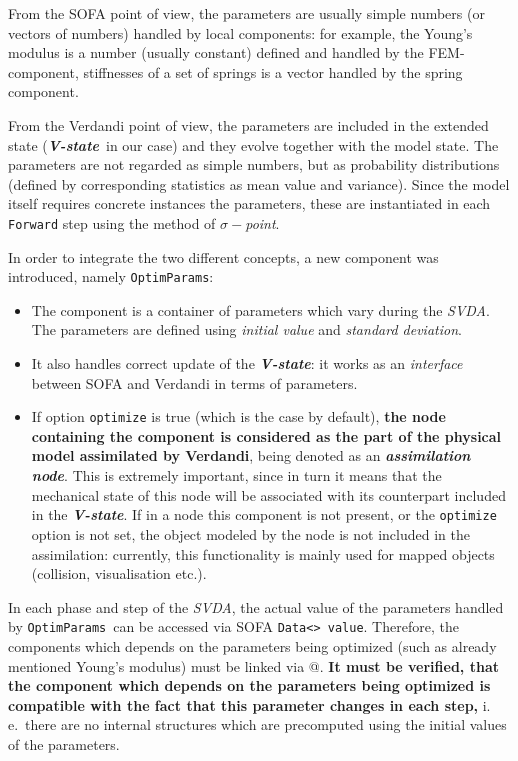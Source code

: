 \documentclass[10pt]{article}
\def\ie{i.\,e.}
\def\asn{\textit{\textbf{assimilation node}}}
\def\vstate{\textit{\textbf{V-state}}}
\def\svda{\textit{SVDA}}
\def\smp{$\sigma-$\textit{point}}
\def\opr{\texttt{OptimParams}}
\begin{document}
From the SOFA point of view, the parameters are usually simple numbers (or vectors of numbers) handled by local components: for example, the Young's modulus is a number (usually constant) defined and handled by the FEM-component, stiffnesses of a set of springs is a vector handled by the spring component. 

From the Verdandi point of view, the parameters are included in the extended  state (\vstate\ in our case) and they evolve together with the model state. The parameters are not regarded as simple numbers, 
but as probability distributions (defined by corresponding statistics as mean value and variance). Since the model itself requires concrete instances the parameters, these are instantiated in each \texttt{Forward} step using the method of \smp.

In order to integrate the two different concepts, a new component was introduced, namely \opr:
\begin{itemize}
\item The component is a container of parameters which vary during the \svda. The parameters are defined using \emph{initial value} and \emph{standard deviation}.
\item It also handles correct update of the \vstate: it works as an \emph{interface} between SOFA and Verdandi in terms of parameters. 
\item If option \texttt{optimize} is true (which is the case by default), \textbf{the node containing the component is considered as the part of the physical model assimilated by Verdandi}, being denoted as an \asn. This is extremely important, since in turn it means that the mechanical state of this node will be associated with its counterpart included in the \vstate. If in a node this component is not present, or the \texttt{optimize} option is not set, the object modeled by the node is not included in the assimilation: currently, this functionality is mainly used for mapped objects (collision, visualisation etc.). 
\end{itemize}
In each phase and step of the \svda, the actual value of the parameters handled by \opr\ can be accessed via SOFA \texttt{Data<> value}. Therefore, the components which depends on the parameters being optimized (such as already mentioned Young's modulus) must be linked via @. \textbf{It must be verified, that the component which depends on the parameters being optimized is compatible with the fact that this parameter changes in each step,} \ie\ there are no internal structures which are precomputed using the initial values of the parameters. 
\end{document}
